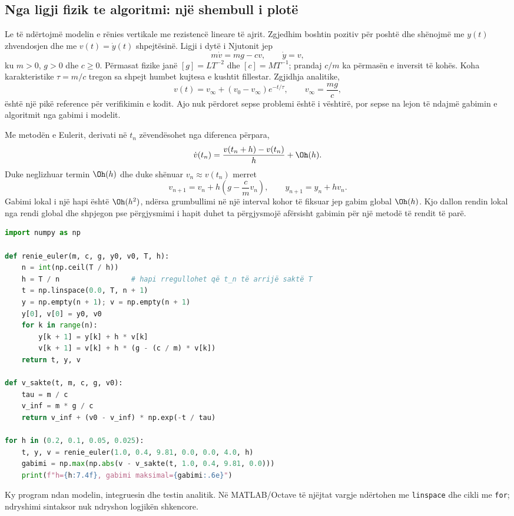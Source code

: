 \subsection{Nga ligji fizik te algoritmi: një shembull i plotë}
Le të ndërtojmë modelin e rënies vertikale me rezistencë lineare të ajrit. Zgjedhim boshtin pozitiv për poshtë dhe shënojmë me $y(t)$ zhvendosjen dhe me $v(t)=\dot y(t)$ shpejtësinë. Ligji i dytë i Njutonit jep
\begin{equation}
 m\dot v=mg-cv,\qquad \dot y=v,
\end{equation}
ku $m>0$, $g>0$ dhe $c\ge0$. Përmasat fizike janë $[g]=LT^{-2}$ dhe $[c]=MT^{-1}$; prandaj $c/m$ ka përmasën e inversit të kohës. Koha karakteristike $\tau=m/c$ tregon sa shpejt humbet kujtesa e kushtit fillestar. Zgjidhja analitike,
\begin{equation}
 v(t)=v_\infty+(v_0-v_\infty)e^{-t/\tau},\qquad v_\infty=\frac{mg}{c},
\end{equation}
është një pikë reference për verifikimin e kodit. Ajo nuk përdoret sepse problemi është i vështirë, por sepse na lejon të ndajmë gabimin e algoritmit nga gabimi i modelit.

Me metodën e Eulerit, derivati në $t_n$ zëvendësohet nga diferenca përpara,
\begin{equation}
 \dot v(t_n)=\frac{v(t_n+h)-v(t_n)}{h}+\Oh(h).
\end{equation}
Duke neglizhuar termin $\Oh(h)$ dhe duke shënuar $v_n\approx v(t_n)$ merret
\begin{equation}
 v_{n+1}=v_n+h\left(g-\frac{c}{m}v_n\right),\qquad y_{n+1}=y_n+hv_n.
\end{equation}
Gabimi lokal i një hapi është $\Oh(h^2)$, ndërsa grumbullimi në një interval kohor të fiksuar jep gabim global $\Oh(h)$. Kjo dallon rendin lokal nga rendi global dhe shpjegon pse përgjysmimi i hapit duhet ta përgjysmojë afërsisht gabimin për një metodë të rendit të parë.

\begin{lstlisting}[language=Python,caption={Eksperiment konvergjence për rënien me rezistencë lineare.}]
import numpy as np

def renie_euler(m, c, g, y0, v0, T, h):
    n = int(np.ceil(T / h))
    h = T / n                 # hapi rregullohet që t_n të arrijë saktë T
    t = np.linspace(0.0, T, n + 1)
    y = np.empty(n + 1); v = np.empty(n + 1)
    y[0], v[0] = y0, v0
    for k in range(n):
        y[k + 1] = y[k] + h * v[k]
        v[k + 1] = v[k] + h * (g - (c / m) * v[k])
    return t, y, v

def v_sakte(t, m, c, g, v0):
    tau = m / c
    v_inf = m * g / c
    return v_inf + (v0 - v_inf) * np.exp(-t / tau)

for h in (0.2, 0.1, 0.05, 0.025):
    t, y, v = renie_euler(1.0, 0.4, 9.81, 0.0, 0.0, 4.0, h)
    gabimi = np.max(np.abs(v - v_sakte(t, 1.0, 0.4, 9.81, 0.0)))
    print(f"h={h:7.4f}, gabimi maksimal={gabimi:.6e}")
\end{lstlisting}
Ky program ndan modelin, integruesin dhe testin analitik. Në MATLAB/Octave të njëjtat vargje ndërtohen me \texttt{linspace} dhe cikli me \texttt{for}; ndryshimi sintaksor nuk ndryshon logjikën shkencore.

